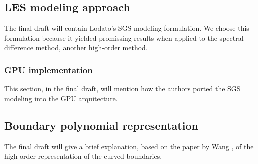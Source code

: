 \subsection{LES modeling approach}
The final draft will contain Lodato's\cite{lodato2012} SGS modeling formulation. We choose this formulation because it yielded promissing results when applied to the spectral difference method, another high-order method.
\subsubsection{GPU implementation}
This section, in the final draft, will mention how the authors ported the SGS modeling into the GPU arquitecture.
\subsection{Boundary polynomial representation}
The final draft will give a brief explanation, based on the paper by Wang \cite{wang2006}, of the high-order representation of the curved boundaries.

